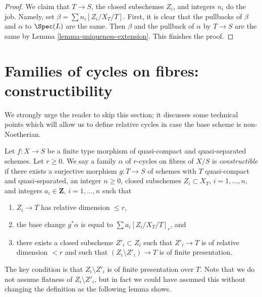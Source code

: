 \begin{proof}
\medskip\noindent
We claim that $T \to S$, the closed subschemes $Z_i$, and integers
$n_i$ do the job. Namely, set $\beta = \sum n_i[Z_i/X_T/T]$.
First, it is clear that the pullbacks of $\beta$ and $\alpha$
to $\Spec(L)$ are the same. Then $\beta$ and the pullback of
$\alpha$ by $T \to S$ are the same by Lemma \ref{lemma-uniqueness-extension}.
This finishes the proof.
\end{proof}






\section{Families of cycles on fibres: constructibility}
\label{section-families-constructible}

\noindent
We strongly urge the reader to skip this section; it discusses
some technical points which will allow us to define relative cycles
in case the base scheme is non-Noetherian.

\begin{definition}
\label{definition-constructible}
Let $f : X \to S$ be a finite type morphism of quasi-compact
and quasi-separated schemes. Let $r \geq 0$. We say a family $\alpha$ of
$r$-cycles on fibres of $X/S$ is {\it constructible} if there exists
a surjective morphism $g : T \to S$ of schemes with $T$ quasi-compact
and quasi-separated, an integer $n \geq 0$, closed subschemes
$Z_i \subset X_T$, $i = 1, \ldots, n$, and integers $a_i \in \mathbf{Z}$,
$i = 1, \ldots, n$ such that
\begin{enumerate}
\item $Z_i \to T$ has relative dimension $\leq r$,
\item the base change $g^*\alpha$ is equal to $\sum a_i [Z_i/X_T/T]_r$, and
\item there exists a closed subscheme $Z'_i \subset Z_i$ such that
$Z'_i \to T$ is of relative dimension $< r$ and such that
$(Z_i \setminus Z'_i) \to T$ is of finite presentation.
\end{enumerate}
\end{definition}

\noindent
The key condition is that $Z_i \setminus Z'_i$ is of finite presentation
over $T$. Note that we do not assume flatness of $Z_i \setminus Z'_i$, but
in fact we could have assumed this without changing the definition as the
following lemma shows.


